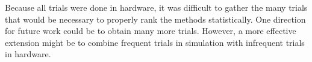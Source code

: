 
Because all trials were done in hardware, it was difficult to gather
the many trials that would be necessary to properly rank the methods
statistically.  One direction for future work could be to obtain many
more trials. However, a more effective extension might be to combine
frequent trials in simulation with infrequent trials in
hardware.

